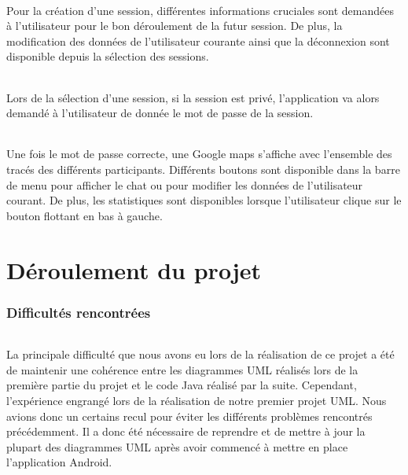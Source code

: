 \documentclass[titlepage, 12pt]{report}
\begin{document}

\paragraph{}Pour la création d'une session, différentes informations cruciales sont demandées à l'utilisateur pour le bon déroulement de la futur session.
De plus, la modification des données de l'utilisateur courante ainsi que la déconnexion sont disponible depuis la sélection des sessions.



\paragraph{}Lors de la sélection d'une session, si la session est privé, l'application va alors demandé à l'utilisateur de donnée le mot de passe de la session.


\paragraph{}Une fois le mot de passe correcte, une Google maps s'affiche avec l'ensemble des tracés des différents participants. Différents boutons sont disponible dans la barre de menu pour afficher le chat ou pour modifier les données de l'utilisateur courant. De plus, les statistiques sont disponibles lorsque l'utilisateur clique sur le bouton flottant en bas à gauche.




\part{Déroulement du projet}

\section{Difficultés rencontrées}

\paragraph{}La principale difficulté que nous avons eu lors de la réalisation de ce projet a été de maintenir une cohérence entre les diagrammes UML réalisés lors de la première partie du projet et le code Java réalisé par la suite. Cependant, l'expérience engrangé lors de la réalisation de notre premier projet UML. Nous avions donc un certains recul pour éviter les différents problèmes rencontrés précédemment.
Il a donc été nécessaire de reprendre et de mettre à jour la plupart des diagrammes UML après avoir commencé à mettre en place l'application Android.
\end{document}
